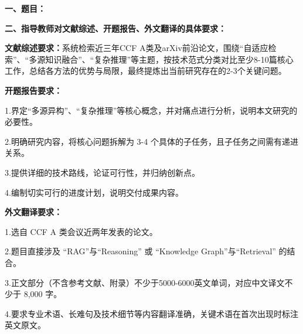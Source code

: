{
    \setlength{\parindent}{0em}
    \par {\bfseries 一、题目：\Title}
    \par {\bfseries 二、指导教师对文献综述、开题报告、外文翻译的具体要求：}
    \vspace{0.6em}
    {
        \par \textbf{文献综述要求：}系统检索近三年CCF A类及arXiv前沿论文，围绕“自适应检索”、“多源知识融合”、“复杂推理”等主题，按技术范式分类对比至少8-10篇核心工作，总结各方法的优势与局限，最终提炼出当前研究存在的2-3个关键问题。

        \vspace{0.4em}
        \par \textbf{开题报告要求：}
        \par 1.\quad 界定“多源异构”、“复杂推理”等核心概念，并对痛点进行分析，说明本文研究的必要性。
        \par 2.\quad 明确研究内容，将核心问题拆解为 3-4 个具体的子任务，且子任务之间需有递进关系。
        \par 3.\quad 提供详细的技术路线，论证可行性，并归纳创新点。
        \par 4.\quad 编制切实可行的进度计划，说明交付成果内容。

        \vspace{0.4em}
        \par \textbf{外文翻译要求：}
        \par 1.\quad 选自 CCF A 类会议近两年发表的论文。
        \par 2.\quad 题目直接涉及 “RAG”与“Reasoning” 或 “Knowledge Graph”与“Retrieval” 的结合。
        \par 3.\quad 正文部分（不含参考文献、附录）不少于5000-6000英文单词，对应中文译文不少于 8,000 字。
        \par 4.\quad 要求专业术语、长难句及技术细节等内容翻译准确，关键术语在首次出现时标注英文原文。
    }


}

\mbox{} \vfill

\signature{指导教师（签名）}
